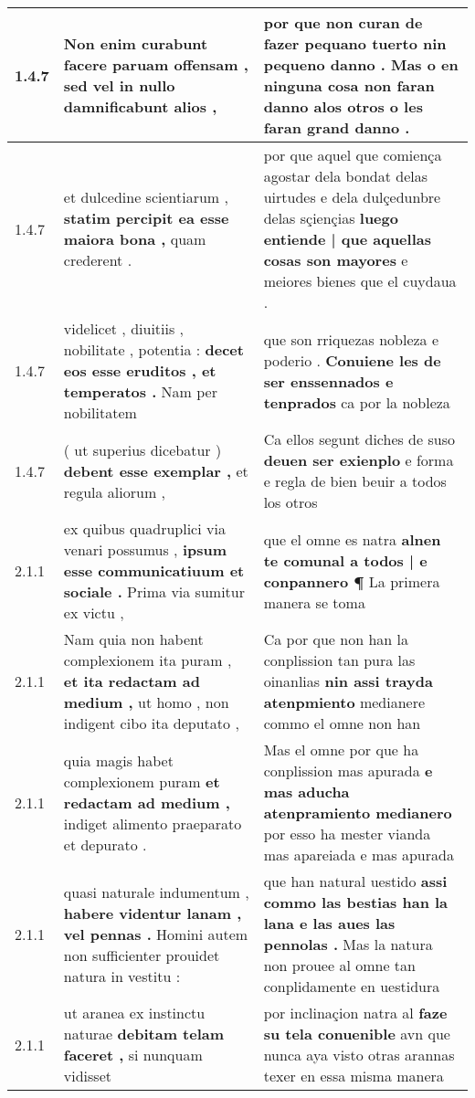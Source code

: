 \begin{tabular}{|p{1cm}|p{6.5cm}|p{6.5cm}|}
1.4.7 & Non enim curabunt \textbf{ facere paruam offensam , } sed vel in nullo damnificabunt alios , & por que non curan de fazer \textbf{ pequano tuerto nin pequeno danno . } Mas o en ninguna cosa non faran danno alos otros o les faran grand danno . \\\hline
1.4.7 & et dulcedine scientiarum , \textbf{ statim percipit ea esse maiora bona , } quam crederent . & por que aquel que comiença agostar dela bondat delas uirtudes e dela dulçedunbre delas sçiençias \textbf{ luego entiende | que aquellas cosas son mayores } e meiores bienes que el cuydaua . \\\hline
1.4.7 & videlicet , diuitiis , nobilitate , potentia : \textbf{ decet eos esse eruditos , et temperatos . } Nam per nobilitatem & que son rriquezas nobleza e poderio . \textbf{ Conuiene les de ser enssennados e tenprados } ca por la nobleza \\\hline
1.4.7 & ( ut superius dicebatur ) \textbf{ debent esse exemplar , } et regula aliorum , & Ca ellos segunt diches de suso \textbf{ deuen ser exienplo } e forma e regla de bien beuir a todos los otros \\\hline
2.1.1 & ex quibus quadruplici via venari possumus , \textbf{ ipsum esse communicatiuum et sociale . } Prima via sumitur ex victu , & que el omne es natra \textbf{ alnen te comunal a todos | e conpannero ¶ } La primera manera se toma \\\hline
2.1.1 & Nam quia non habent complexionem ita puram , \textbf{ et ita redactam ad medium , } ut homo , non indigent cibo ita deputato , & Ca por que non han la conplission tan pura las oinanlias \textbf{ nin assi trayda atenpmiento } medianere commo el omne non han \\\hline
2.1.1 & quia magis habet complexionem puram \textbf{ et redactam ad medium , } indiget alimento praeparato et depurato . & Mas el omne por que ha conplission mas apurada \textbf{ e mas aducha atenpramiento medianero } por esso ha mester vianda mas apareiada e mas apurada \\\hline
2.1.1 & quasi naturale indumentum , \textbf{ habere videntur lanam , vel pennas . } Homini autem non sufficienter prouidet natura in vestitu : & que han natural uestido \textbf{ assi commo las bestias han la lana e las aues las pennolas . } Mas la natura non prouee al omne tan conplidamente en uestidura \\\hline
2.1.1 & ut aranea ex instinctu naturae \textbf{ debitam telam faceret , } si nunquam vidisset & por inclinaçion natra al \textbf{ faze su tela conuenible } avn que nunca aya visto otras arannas texer en essa misma manera \\\hline

\end{tabular}
